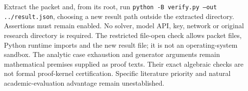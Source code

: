 \documentclass[pdflatex,sn-mathphys-num]{sn-jnl}
\theoremstyle{thmstyleone}
\theoremstyle{thmstylethree}
\theoremstyle{thmstyletwo}
\begin{document}
Extract the packet and, from its root, run
\texttt{python -B verify.py --out ../result.json}, choosing a new result
path outside the extracted directory. Assertions must remain enabled.
No solver, model API, key, network or original research directory is required.
The restricted file-open check allows packet files, Python runtime imports
and the new result file; it is not an operating-system sandbox.
The analytic case exhaustion and generator arguments remain mathematical
premises supplied as proof texts. Their exact algebraic checks are not
formal proof-kernel certification. Specific literature priority and
natural academic-evaluation advantage remain unestablished.




\end{document}
